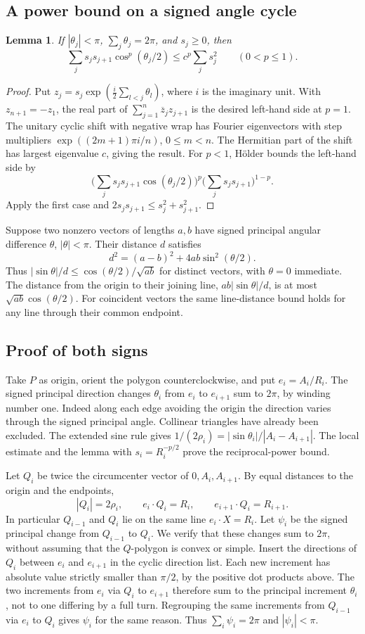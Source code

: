 \documentclass[11pt,a4paper]{article}
\numberwithin{equation}{section}
\newtheorem{lemma}[theorem]{Lemma}
\theoremstyle{definition}
\theoremstyle{remark}
\begin{document}
\subsection{A power bound on a signed angle cycle}
\begin{lemma}
If $|\theta_j|<\pi$, $\sum_j\theta_j=2\pi$, and $s_j\ge0$, then
\[
 \sum_j s_j s_{j+1}\cos^p(\theta_j/2)\le c^p\sum_j s_j^2
 \qquad(0<p\le1).
\]
\end{lemma}
\begin{proof}
Put $z_j=s_j\exp(\frac{i}{2}\sum_{l<j}\theta_l)$, where $i$ is the imaginary unit. With $z_{n+1}=-z_1$, the real part of $\sum_{j=1}^n\overline z_j z_{j+1}$ is the desired left-hand side at $p=1$. The unitary cyclic shift with negative wrap has Fourier eigenvectors with step multipliers $\exp((2m+1)\pi i/n)$, $0\le m<n$. The Hermitian part of the shift has largest eigenvalue $c$, giving the result. For $p<1$, H\"older bounds the left-hand side by
\[
 \Big(\sum_j s_j s_{j+1}\cos(\theta_j/2)\Big)^p
 \Big(\sum_j s_j s_{j+1}\Big)^{1-p}.
\]
Apply the first case and $2s_j s_{j+1}\le s_j^2+s_{j+1}^2$.
\end{proof}
Suppose two nonzero vectors of lengths $a,b$ have signed principal angular difference $\theta$, $|\theta|<\pi$. Their distance $d$ satisfies
\[
 d^2=(a-b)^2+4ab\sin^2(\theta/2).
\]
Thus $|\sin\theta|/d\le\cos(\theta/2)/\sqrt{ab}$ for distinct vectors, with $\theta=0$ immediate. The distance from the origin to their joining line, $ab|\sin\theta|/d$, is at most $\sqrt{ab}\cos(\theta/2)$. For coincident vectors the same line-distance bound holds for any line through their common endpoint.
\subsection{Proof of both signs}
Take $P$ as origin, orient the polygon counterclockwise, and put $e_i=A_i/R_i$. The signed principal direction changes $\theta_i$ from $e_i$ to $e_{i+1}$ sum to $2\pi$, by winding number one. Indeed along each edge avoiding the origin the direction varies through the signed principal angle. Collinear triangles have already been excluded. The extended sine rule gives $1/(2\rho_i)=|\sin\theta_i|/|A_i-A_{i+1}|$. The local estimate and the lemma with $s_i=R_i^{-p/2}$ prove the reciprocal-power bound.

Let $Q_i$ be twice the circumcenter vector of $0,A_i,A_{i+1}$. By equal distances to the origin and the endpoints,
\[
 |Q_i|=2\rho_i,\qquad e_i\cdot Q_i=R_i,\qquad e_{i+1}\cdot Q_i=R_{i+1}.
\]
In particular $Q_{i-1}$ and $Q_i$ lie on the same line $e_i\cdot X=R_i$. Let $\psi_i$ be the signed principal change from $Q_{i-1}$ to $Q_i$. We verify that these changes sum to $2\pi$, without assuming that the $Q$-polygon is convex or simple. Insert the directions of $Q_i$ between $e_i$ and $e_{i+1}$ in the cyclic direction list. Each new increment has absolute value strictly smaller than $\pi/2$, by the positive dot products above. The two increments from $e_i$ via $Q_i$ to $e_{i+1}$ therefore sum to the principal increment $\theta_i$, not to one differing by a full turn. Regrouping the same increments from $Q_{i-1}$ via $e_i$ to $Q_i$ gives $\psi_i$ for the same reason. Thus $\sum_i\psi_i=2\pi$ and $|\psi_i|<\pi$.
\end{document}

